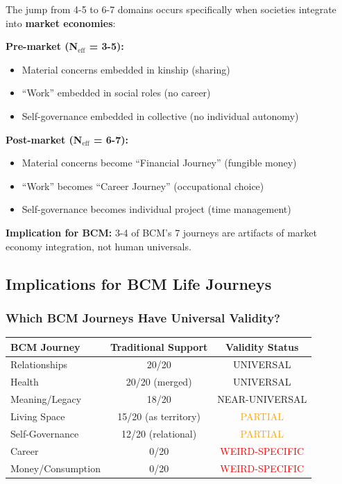 \begin{tcolorbox}[colback=red!5!white, colframe=red!75!black, title=Critical Finding: Market Economy Creates Domain Proliferation]

The jump from 4-5 to 6-7 domains occurs specifically when societies integrate into \textbf{market economies}:

\textbf{Pre-market (N$_{\text{eff}}$ = 3-5):}
\begin{itemize}[nosep]
\item Material concerns embedded in kinship (sharing)
\item ``Work'' embedded in social roles (no career)
\item Self-governance embedded in collective (no individual autonomy)
\end{itemize}

\textbf{Post-market (N$_{\text{eff}}$ = 6-7):}
\begin{itemize}[nosep]
\item Material concerns become ``Financial Journey'' (fungible money)
\item ``Work'' becomes ``Career Journey'' (occupational choice)
\item Self-governance becomes individual project (time management)
\end{itemize}

\textbf{Implication for BCM:} 3-4 of BCM's 7 journeys are artifacts of market economy integration, not human universals.

\end{tcolorbox}

\subsection{Implications for BCM Life Journeys}

\subsubsection{Which BCM Journeys Have Universal Validity?}

\begin{center}
\begin{tabular}{@{}lcc@{}}
\toprule
\textbf{BCM Journey} & \textbf{Traditional Support} & \textbf{Validity Status} \\
\midrule
Relationships & 20/20 & \textcolor{green!70!black}{UNIVERSAL} \\
Health & 20/20 (merged) & \textcolor{green!70!black}{UNIVERSAL} \\
Meaning/Legacy & 18/20 & \textcolor{green!70!black}{NEAR-UNIVERSAL} \\
Living Space & 15/20 (as territory) & \textcolor{orange}{PARTIAL} \\
Self-Governance & 12/20 (relational) & \textcolor{orange}{PARTIAL} \\
Career & 0/20 & \textcolor{red}{WEIRD-SPECIFIC} \\
Money/Consumption & 0/20 & \textcolor{red}{WEIRD-SPECIFIC} \\
\bottomrule
\end{tabular}
\end{center}

